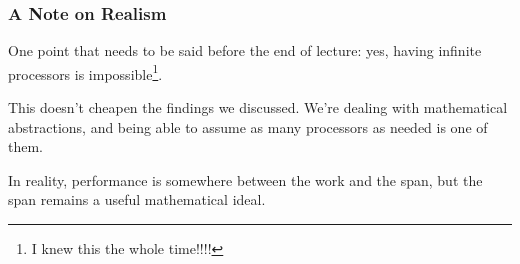 \documentclass[aspectratio=169]{beamer}
\begin{document}
\begin{frame}[fragile]
  \frametitle{ A Note on Realism }

  One point that needs to be said before the end of lecture: yes, having
  infinite processors is impossible\footnote{I knew this the whole time!!!!}.

  \pause
  \vspace{\fill}

  This doesn't cheapen the findings we discussed. We're dealing with
  mathematical abstractions, and being able to assume as many processors
  as needed is one of them.

  \pause
  \vspace{\fill}

  In reality, performance is somewhere between the work and the span, but
  the span remains a useful mathematical ideal.
\end{frame}



\thankyou

\end{document}
